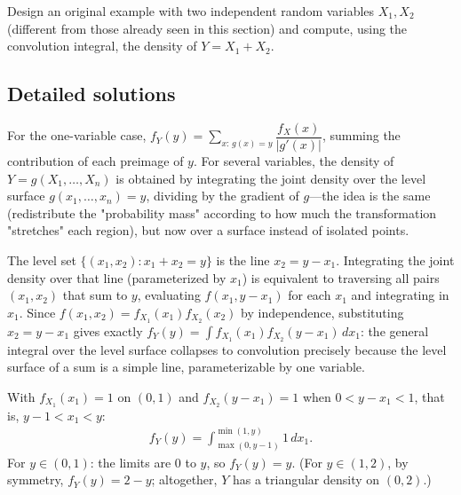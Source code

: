 \begin{problema}
	\label{prob:db5d952}
	Design an original example with two independent random variables $X_1, X_2$ (different from those already seen in this section) and compute, using the convolution integral, the density of $Y=X_1+X_2$.
\end{problema}

\subsection*{Detailed solutions}

\begin{solproblema}[prob:0b1575d]
	For the one-variable case, $f_Y(y) = \sum_{x:\,g(x)=y} \dfrac{f_X(x)}{|g'(x)|}$, summing the contribution of each preimage of $y$. For several variables, the density of $Y=g(X_1,\ldots,X_n)$ is obtained by integrating the joint density over the level surface $g(x_1,\ldots,x_n)=y$, dividing by the gradient of $g$---the idea is the same (redistribute the "probability mass" according to how much the transformation "stretches" each region), but now over a surface instead of isolated points.
\end{solproblema}

\begin{solproblema}[prob:a8b056e]
	The level set $\{(x_1,x_2): x_1+x_2=y\}$ is the line $x_2=y-x_1$. Integrating the joint density over that line (parameterized by $x_1$) is equivalent to traversing all pairs $(x_1,x_2)$ that sum to $y$, evaluating $f(x_1,y-x_1)$ for each $x_1$ and integrating in $x_1$. Since $f(x_1,x_2)=f_{X_1}(x_1)f_{X_2}(x_2)$ by independence, substituting $x_2=y-x_1$ gives exactly $f_Y(y)=\int f_{X_1}(x_1)f_{X_2}(y-x_1)\,dx_1$: the general integral over the level surface collapses to convolution precisely because the level surface of a sum is a simple line, parameterizable by one variable.
\end{solproblema}

\begin{solproblema}
	With $f_{X_1}(x_1)=1$ on $(0,1)$ and $f_{X_2}(y-x_1)=1$ when $0<y-x_1<1$, that is, $y-1<x_1<y$:
	\begin{align*}
		f_Y(y) = \int_{\max(0,y-1)}^{\min(1,y)} 1\,dx_1.
	\end{align*}
	For $y\in(0,1)$: the limits are $0$ to $y$, so $f_Y(y) = y$. (For $y\in(1,2)$, by symmetry, $f_Y(y)=2-y$; altogether, $Y$ has a triangular density on $(0,2)$.)
\end{solproblema}

